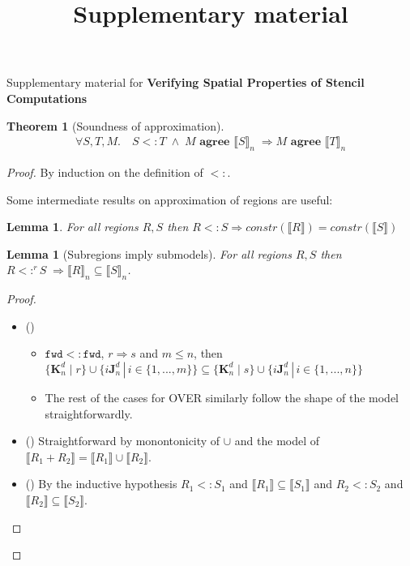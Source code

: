 \documentclass[10pt]{sigplanconf}
\title{Supplementary material}
\newcounter{block}
\newtheorem{lemma}[block]{Lemma}
\theoremstyle{definition}
\newtheorem{theorem}[block]{Theorem}
\newcommand{\interp}[1]{\llbracket{#1}\rrbracket}
\newcommand{\term}[1]{\texttt{#1}}
\newcommand{\singleEntry}[2]{\textbf{J}_{#2}^{#1}}
\newcommand{\zeroEntry}[2]{\textbf{K}_{#2}^{#1}}
\newcommand{\consAName}{\textbf{agree}}
\newcommand{\consA}[2]{#1 \,\, \consAName{} \,\, #2}
\newcommand{\trule}[1]{{\footnotesize{(\text{#1})}}}
\begin{document}
\onecolumn

\begin{center}
{\LARGE{{Supplementary material for 
\textbf{Verifying Spatial Properties of Stencil Computations}}}}
\end{center}

\appendix



\begin{theorem}[Soundness of approximation]
\begin{align*}
\forall S, T, M . \quad S <: T \; \wedge \; \consA{M}{\interp{S}_n}  \;
\Rightarrow \consA{M}{\interp{T}_n}
\end{align*}
\end{theorem}

\begin{proof}
By induction on the definition of $<:$.

Some intermediate results on approximation of regions are useful:

\begin{lemma}
For all regions $R, S$ then $R <: S \Rightarrow \textit{constr}(\interp{R})
= \textit{constr}(\interp{S})$
\end{lemma}

\begin{lemma}[Subregions imply submodels]
For all regions $R, S$ then  $R <:^r S \; \Rightarrow \interp{R}_n
\subseteq \interp{S}_n$.
\label{lem:subr-to-subm}
\end{lemma}
\begin{proof}
\begin{itemize}
\item \trule{\textsc{over}}  
 \begin{itemize}
   \item $\term{fwd} <: \term{fwd}$, $r \Rightarrow s$ and $m \leq n$,
     then $\{\zeroEntry{d}{n} \mid r \} \cup
 \{i\singleEntry{d}{n} \,|\, i \in \{1, ..., m\} \} \subseteq 
\{\zeroEntry{d}{n} \mid s \} \cup
 \{i\singleEntry{d}{n} \,|\, i \in \{1, ..., n\} \}$
   \item The rest of the cases for OVER similarly follow the shape of
     the model straightforwardly.
 \end{itemize}
\item \trule{\textsc{cong$\term{+}$}} Straightforward by monontonicity
  of $\cup$ and the model of $\interp{R_1 + R_2} = \interp{R_1} \cup
  \interp{R_2}$.
\item \trule{\textsc{cong$\term{*}$}} By the inductive hypothesis
$R_1 <: S_1$ and $\interp{R_1} \subseteq \interp{S_1}$ and
$R_2 <: S_2$ and $\interp{R_2} \subseteq \interp{S_2}$. 


\end{itemize}
\end{proof}
\end{proof}
\end{document}
